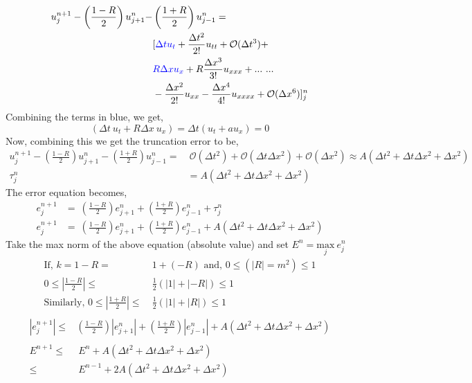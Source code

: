 \documentclass[11pt]{article}
\newcommand{\Oc}{\mathcal{O}}
\newcommand{\dx}{\Delta x}
\newcommand{\dt}{\Delta t}
\newcommand{\ux}{u_x}
\newcommand{\uxx}{u_{xx}}
\newcommand{\uxxx}{u_{xxx}}
\newcommand{\uxxxx}{u_{xxxx}}
\newcommand{\ut}{u_t}
\newcommand{\enj}{e^{n}_{j}}
\newcommand{\enpj}{e^{n+1}_{j}}
\newcommand{\enjp}{e^{n}_{j+1}}
\newcommand{\enjm}{e^{n}_{j-1}}
\newcommand{\unpj}{u^{n+1}_{j}}
\newcommand{\unjp}{u^{n}_{j+1}}
\newcommand{\unjm}{u^{n}_{j-1}}
\newcommand{\modu}[1]{\left | {#1} \right |}
\begin{document}
\begin{enumerate}
   \begin{align*}
   \unpj - \left(\frac{1-R}{2}\right)\unjp - & \left(\frac{1+R}{2}\right)\unjm =  \\
   & [{\color{blue}\dt \ut} + \frac{\dt^2}{2!}u_{tt} + \Oc(\dt^3) +  \\
   & {\color{blue}R\dx \ux} + R\frac{\dx^3}{3!}\uxxx + ... \ ... \\
   & - \frac{\dx^2}{2!}\uxx - \frac{\dx^4}{4!}\uxxxx + \Oc(\dx^6) ]^n_j
   \end{align*}
    Combining the terms in blue, we get, 
    \[
    \left(\dt \ u_t + R\dx \ \ux \right) = \dt \left(u_t + a\ux \right) = 0
    \]
    Now, combining this we get the truncation error to be, 
    \begin{align*}
    \unpj - \left(\frac{1-R}{2}\right)\unjp - \left(\frac{1+R}{2}\right)\unjm = & \ \Oc(\dt^2) + \Oc(\dt \dx^2) + \Oc(\dx^2) \approx A\left(\dt^2 + \dt \dx^2 + \dx^2\right) \\
    \tau^{n}_j & = A\left(\dt^2 + \dt \dx^2 + \dx^2\right)
    \end{align*}
    The error equation becomes,
    \begin{align*}
    \enpj & = \ \left(\frac{1-R}{2}\right)\enjp + \left(\frac{1+R}{2}\right)\enjm + \tau^{n}_{j} \\
     \enpj & = \ \left(\frac{1-R}{2}\right)\enjp + \left(\frac{1+R}{2}\right)\enjm + A\left(\dt^2 + \dt \dx^2 + \dx^2\right)
    \end{align*}
    Take the max norm of the above equation (absolute value) and set $E^n = \underset{j}{\text{max}} \ \enj$
    \begin{align*}
    \text{If, } k = 1 - R =& \ 1 + \left(-R\right) \text{ and, } 0 \leq (\modu{R} = m^2) \leq 1\\
    0\leq \modu{\frac{1-R}{2}} \leq & \ \frac{1}{2} \left(\modu{1} + \modu{-R} \right)\leq 1 \\
    \text{Similarly, } 0 \leq \modu{\frac{1+R}{2}} \leq & \ \frac{1}{2} \left(\modu{1}+\modu{R}\right) \leq 1\\
    \end{align*}
    \begin{align*}
    \modu{\enpj} \leq & \left(\frac{1-R}{2}\right)\modu{\enjp} + \left(\frac{1+R}{2}\right)\modu{\enjm} + A\left(\dt^2 + \dt \dx^2 + \dx^2\right) \\ \\
    E^{n+1} \leq & \ E^{n} + A\left(\dt^2 + \dt \dx^2 + \dx^2\right) \\
    \leq &\ E^{n-1} + 2A\left(\dt^2 + \dt \dx^2 + \dx^2\right) \\

\end{align*}
\end{enumerate}
\end{document}
